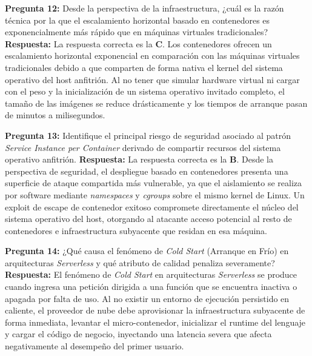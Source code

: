 \noindent\textbf{Pregunta 12:} Desde la perspectiva de la infraestructura, ¿cuál es la razón técnica por la que el escalamiento horizontal basado en contenedores es exponencialmente más rápido que en máquinas virtuales tradicionales?
\newline
\textbf{Respuesta:} La respuesta correcta es la \textbf{C}. Los contenedores ofrecen un escalamiento horizontal exponencial en comparación con las máquinas virtuales tradicionales debido a que comparten de forma nativa el kernel del sistema operativo del host anfitrión. Al no tener que simular hardware virtual ni cargar con el peso y la inicialización de un sistema operativo invitado completo, el tamaño de las imágenes se reduce drásticamente y los tiempos de arranque pasan de minutos a milisegundos.

\vspace{4mm}

\noindent\textbf{Pregunta 13:} Identifique el principal riesgo de seguridad asociado al patrón \textit{Service Instance per Container} derivado de compartir recursos del sistema operativo anfitrión.
\newline
\textbf{Respuesta:} La respuesta correcta es la \textbf{B}. Desde la perspectiva de seguridad, el despliegue basado en contenedores presenta una superficie de ataque compartida más vulnerable, ya que el aislamiento se realiza por software mediante \textit{namespaces} y \textit{cgroups} sobre el mismo kernel de Linux. Un exploit de escape de contenedor exitoso compromete directamente el núcleo del sistema operativo del host, otorgando al atacante acceso potencial al resto de contenedores e infraestructura subyacente que residan en esa máquina.

\vspace{4mm}

\noindent\textbf{Pregunta 14:} ¿Qué causa el fenómeno de \textit{Cold Start} (Arranque en Frío) en arquitecturas \textit{Serverless} y qué atributo de calidad penaliza severamente?
\newline
\textbf{Respuesta:} El fenómeno de \textit{Cold Start} en arquitecturas \textit{Serverless} se produce cuando ingresa una petición dirigida a una función que se encuentra inactiva o apagada por falta de uso. Al no existir un entorno de ejecución persistido en caliente, el proveedor de nube debe aprovisionar la infraestructura subyacente de forma inmediata, levantar el micro-contenedor, inicializar el runtime del lenguaje y cargar el código de negocio, inyectando una latencia severa que afecta negativamente al desempeño del primer usuario.


